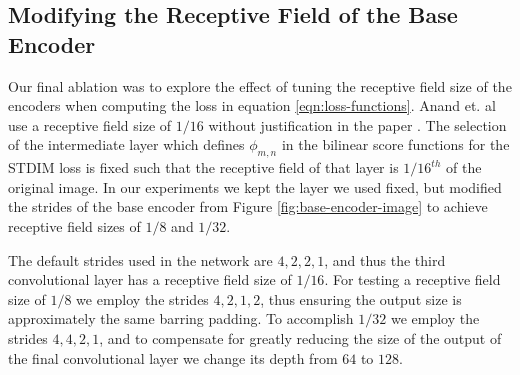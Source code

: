 \subsection{Modifying the Receptive Field of the Base Encoder}
\label{section:receptive-field}

Our final ablation was to explore the effect of tuning the receptive field size of the encoders when computing the loss in equation \ref{eqn:loss-functions}. Anand et. al use a receptive field size of $1/16$ without justification in the paper \cite{main_article}. The selection of the intermediate layer which defines $\phi_{m,n}$ in the bilinear score functions for the STDIM loss is fixed such that the receptive field of that layer is $1/16^{th}$ of the original image. In our experiments we kept the layer we used fixed, but modified the strides of the base encoder from Figure \ref{fig:base-encoder-image} to achieve receptive field sizes of $1/8$ and $1/32$.

The default strides used in the network are $4, 2, 2, 1$, and thus the third convolutional layer has a receptive field size of $1/16$. For testing a receptive field size of $1/8$ we employ the strides $4, 2, 1, 2$, thus ensuring the output size is approximately the same barring padding. To accomplish $1/32$ we employ the strides $4, 4, 2, 1$, and to compensate for greatly reducing the size of the output of the final convolutional layer we change its depth from $64$ to $128$.

